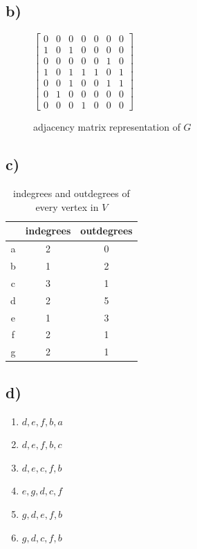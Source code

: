 \documentclass[11pt]{article}
\begin{document}
\subsection*{b)}
\begin{figure}[H]
    \centering
    $\begin{bmatrix} 
        0 & 0 & 0 & 0 & 0 & 0 & 0\\
        1 & 0 & 1 & 0 & 0 & 0 & 0\\
        0 & 0 & 0 & 0 & 0 & 1 & 0\\
        1 & 0 & 1 & 1 & 1 & 0 & 1\\
        0 & 0 & 1 & 0 & 0 & 1 & 1\\
        0 & 1 & 0 & 0 & 0 & 0 & 0\\
        0 & 0 & 0 & 1 & 0 & 0 & 0
    \end{bmatrix}$
    \caption{adjacency matrix representation of $G$}
\end{figure}

\subsection*{c)}

\begin{table}[H]
    \centering
    \begin{tabular}{*3{c}}
        & indegrees & outdegrees\\
        \hline
        a & 2 & 0 \\
        b & 1 & 2 \\
        c & 3 & 1 \\
        d & 2 & 5 \\
        e & 1 & 3 \\
        f & 2 & 1 \\
        g & 2 & 1 \\
    \end{tabular}
    \caption{indegrees and outdegrees of every vertex in $V$}
\end{table}


\subsection*{d)} \label{paths}
\begin{enumerate}
    \item $d,e,f,b,a$
    \item $d,e,f,b,c$
    \item $d,e,c,f,b$
    \item $e,g,d,c,f$
    \item $g,d,e,f,b$
    \item $g,d,c,f,b$
\end{enumerate}
\end{document}
